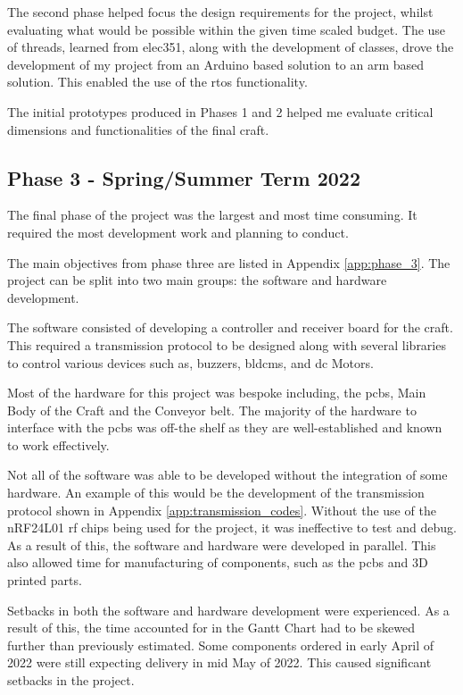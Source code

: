 \documentclass [11pt]{article}
\begin{document}
The second phase helped focus the design requirements for the project, whilst evaluating what would be possible within the given time scaled budget. The use of threads, learned from \gls{elec351}, along with the development of classes, drove the development of my project from an Arduino based solution to an \gls{arm} based solution. This enabled the use of the \gls{rtos} functionality. 

The initial prototypes produced in Phases 1 and 2 helped me evaluate critical dimensions and functionalities of the final craft.

\subsection{Phase 3 - Spring/Summer Term 2022} 

The final phase of the project was the largest and most time consuming. It required the most development work and planning to conduct. 

The main objectives from phase three are listed in Appendix \ref{app:phase_3}. The project can be split into two main groups: the software and hardware development. 

The software consisted of developing a controller and receiver board for the craft. This required a transmission protocol to be designed along with several libraries to control various devices such as, buzzers, \gls{bldcm}s, and \gls{dc} Motors. 

Most of the hardware for this project was bespoke including, the \gls{pcb}s, Main Body of the Craft and the Conveyor belt. The majority of the hardware to interface with the \gls{pcb}s was off-the shelf as they are well-established and known to work effectively.

Not all of the software was able to be developed without the integration of some hardware. An example of this would be the development of the transmission protocol shown in Appendix \ref{app:transmission_codes}. Without the use of the nRF24L01 \gls{rf} chips being used for the project, it was ineffective to test and debug. As a result of this, the software and hardware were developed in parallel. This also allowed time for manufacturing of components, such as the \gls{pcb}s and 3D printed parts.

Setbacks in both the software and hardware development were experienced. As a result of this, the time accounted for in the Gantt Chart had to be skewed further than previously estimated. Some components ordered in early April of 2022 were still expecting delivery in mid May of 2022. This caused significant setbacks in the project. 
\end{document}
